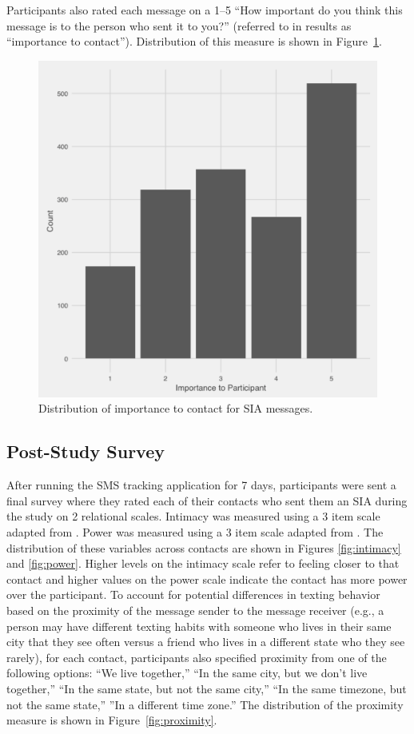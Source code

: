 \documentclass[12pt]{nuthesis}	%
\begin{document}
Participants also rated each message on a 1--5 ``How important do you think this message is to the person who sent it to you?'' (referred to in results as ``importance to contact''). Distribution of this measure is shown in Figure~\ref{fig:importance_contact_distribution}.

\begin{figure}[h]
\centering
\includegraphics[width=.7\textwidth]{figures/importance_distribution}
\caption{Distribution of importance to contact for SIA messages.}
\label{fig:importance_contact_distribution}
\end{figure}


\subsection{Post-Study Survey}

After running the SMS tracking application for 7 days, participants were sent a final survey where they rated each of their contacts who sent them an SIA during the study on 2 relational scales. Intimacy was measured using a 3 item scale adapted from \citet{miller1982assessment}. Power was measured using a 3 item scale adapted from \citet{farrell2015relationship}. The distribution of these variables across contacts are shown in Figures \ref{fig:intimacy} and \ref{fig:power}. Higher levels on the intimacy scale refer to feeling closer to that contact and higher values on the power scale indicate the contact has more power over the participant.  To account for potential differences in texting behavior based on the proximity of the message sender to the message receiver (e.g., a person may have different texting habits with someone who lives in their same city that they see often versus a friend who lives in a different state who they see rarely), for each contact, participants also specified proximity from one of the following options: ``We live together,'' ``In the same city, but we don't live together,'' ``In the same state, but not the same city,'' ``In the same timezone, but not the same state,'' ''In a different time zone.'' The distribution of the proximity measure is shown in Figure~\ref{fig:proximity}.
\end{document}
